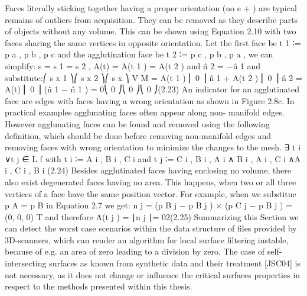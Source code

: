 Faces literally sticking together having a proper orientation (no e + ) are typical remains
of outliers from acquisition. They can be removed as they describe parts of objects
without any volume. This can be shown using Equation 2.10 with two faces sharing
the same vertices in opposite orientation. Let the first face be t 1 ∶= {p a , p b , p c } and the
agglutination face be t 2 ∶= {p c , p b , p a }, we can simplify: s = s 1 = s 2 , A(t) = 
A(t 1 ) = A(t 2 ) and n̂ 2 = −n̂ 1 and substitute:⎛ s x 1 ⎞⎛ s x 2 ⎞⎛ s x ⎞
V M = A(t 1 ) ⎜ 0 ⎟ n̂ 1 + A(t 2 ) ⎜ 0 ⎟ n̂ 2 = A(t) ⎜ 0 ⎟ (n̂ 1 − n̂ 1 ) = 0⎝ 0 ⎠⎝ 0 ⎠⎝ 0 ⎠(2.23)
An indicator for an agglutinated face are edges with faces having a wrong orientation as
shown in Figure 2.8c. In practical examples agglunating faces often appear along non-
manifold edges. However agglunating faces can be found and removed using the following
definition, which should be done before removing non-manifold edges and removing faces
with wrong orientation to minimize the changes to the mesh.
∃ t i ∨t j ∈ L f with t i ∶= {A i , B i , C i } and t j ∶= {C i , B i , A i }∧
{B i , A i , C i }∧{A i , C i , B i } (2.24)
Besides agglutinated faces having enclosing no volume, there also exist degenerated
faces having no area. This happens, when two or all three vertices of a face have the same
position vector. For example, when we substitue p A = p B in Equation 2.7 we get:
n j = (p B j − p B j ) × (p C j − p B j ) = (0, 0, 0) T and therefore A(t j ) =
∣n j ∣= 02(2.25)
Summarizing this Section we can detect the worst case scenarios within the data
structure of files provided by 3D-scanners, which can render an algorithm for local surface
filtering instable, because of e.g. an area of zero leading to a division by zero. The case
of self-intersecting surfaces as known from synthetic data and their treatment [JSC04] is
not necessary, as it does not change or influence the critical surfaces properties in respect
to the methods presented within this thesis.~\cite[p.~32]{Mara12}


